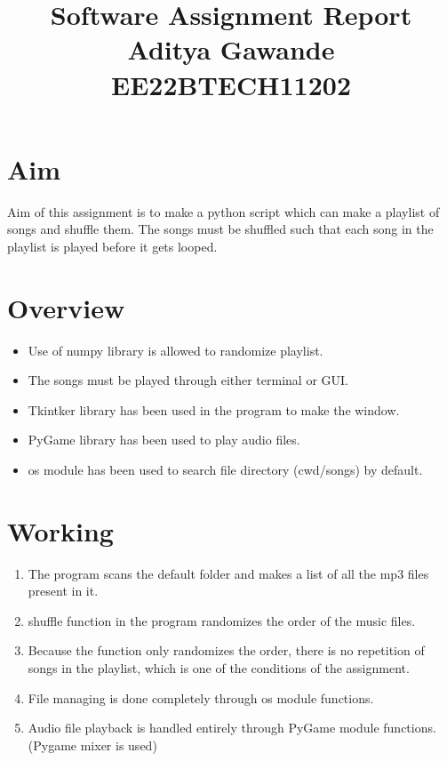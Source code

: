 \documentclass{article}
\begin{document}
\title{Software Assignment Report\\ \large{Aditya Gawande\\EE22BTECH11202}}
\author{}
\date{}
\maketitle

\maketitle

\section*{Aim}
Aim of this assignment is to make a python script which can make a playlist of songs and shuffle them. The songs must be shuffled such that each song in the playlist is played before it gets looped.

\section{Overview}
\begin{itemize}
    \item Use of numpy library is allowed to randomize playlist.
    \item The songs must be played through either terminal or GUI.
    \item Tkintker library has been used in the program to make the window.
    \item PyGame library has been used to play audio files.
    \item os module has been used to search file directory (cwd/songs) by default.
\end{itemize}

\section{Working}
\begin{enumerate}
    \item The program scans the default folder and makes a list of all the mp3 files present in it.
    \item shuffle function in the program randomizes the order of the music files.
    \item Because the function only randomizes the order, there is no repetition of songs in the playlist, which is one of the conditions of the assignment.
    \item File managing is done completely through os module functions.
    \item Audio file playback is handled entirely through PyGame module functions. (Pygame mixer is used)
\end{enumerate}
\end{document}

